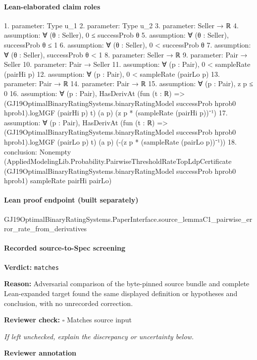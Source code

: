 \documentclass[10pt]{article}
\newcommand{\reviewerbox}{%
  \par\noindent\fbox{\parbox{0.96\linewidth}{\rule{0pt}{0.38in}}}\par
}
\newcommand{\reviewmatch}[1]{%
  \par\noindent\textbf{Reviewer check:} $\square$\; #1\par
  \noindent\emph{If left unchecked, explain the discrepancy or uncertainty below.}\par
}
\begin{document}
\paragraph{Lean-elaborated claim roles}\begin{ReviewVerbatim}
1. parameter: Type u_1
2. parameter: Type u_2
3. parameter: Seller → ℝ
4. assumption: ∀ (θ : Seller), 0 ≤ successProb θ
5. assumption: ∀ (θ : Seller), successProb θ ≤ 1
6. assumption: ∀ (θ : Seller), 0 < successProb θ
7. assumption: ∀ (θ : Seller), successProb θ < 1
8. parameter: Seller → ℝ
9. parameter: Pair → Seller
10. parameter: Pair → Seller
11. assumption: ∀ (p : Pair), 0 < sampleRate (pairHi p)
12. assumption: ∀ (p : Pair), 0 < sampleRate (pairLo p)
13. parameter: Pair → ℝ
14. parameter: Pair → ℝ
15. assumption: ∀ (p : Pair), z p ≤ 0
16. assumption: ∀ (p : Pair),
  HasDerivAt
    (fun (t : ℝ) => (GJ19OptimalBinaryRatingSystems.binaryRatingModel successProb hprob0 hprob1).logMGF (pairHi p) t)
    (a p) (z p * (sampleRate (pairHi p))⁻¹)
17. assumption: ∀ (p : Pair),
  HasDerivAt
    (fun (t : ℝ) => (GJ19OptimalBinaryRatingSystems.binaryRatingModel successProb hprob0 hprob1).logMGF (pairLo p) t)
    (a p) (-(z p * (sampleRate (pairLo p))⁻¹))
18. conclusion: Nonempty
  (AppliedModelingLib.Probability.PairwiseThresholdRateTopLdpCertificate
    (GJ19OptimalBinaryRatingSystems.binaryRatingModel successProb hprob0 hprob1) sampleRate pairHi pairLo)
\end{ReviewVerbatim}

\paragraph{Lean proof endpoint (built separately)}\begin{ReviewVerbatim}
GJ19OptimalBinaryRatingSystems.PaperInterface.source_lemmaC1_pairwise_error_rate_from_derivatives
\end{ReviewVerbatim}

\paragraph{Recorded source-to-Spec screening}
\textbf{Verdict:} \texttt{matches}
\\
{\raggedright
\textbf{Reason:} Adversarial comparison of the byte-\allowbreak{}pinned source bundle and complete Lean-\allowbreak{}expanded target found the same displayed definition or hypotheses and conclusion, with no unrecorded correction.\allowbreak{}
\par}
\reviewmatch{Matches source input}
\noindent\textbf{Reviewer annotation}\par
\reviewerbox
\clearpage
\hypertarget{source-claim-5122f84bd17b3a2c}{}
\end{document}
